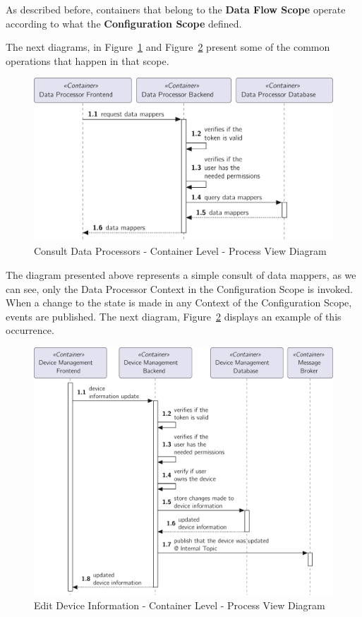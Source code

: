 As described before, containers that belong to the \textbf{Data Flow Scope} operate according to what the \textbf{Configuration Scope} defined.

The next diagrams, in Figure~\ref{fig:design:architecture:platform:container:process:diagram:processor} and Figure~\ref{fig:design:architecture:platform:container:process:diagram:device} present some of the common operations that happen in that scope.

\begin{figure}
   \centering
   \includegraphics[page=1,width=0.8\columnwidth]{assets/diagrams/design/architectural/level2/process/consult-data-processor.pdf}
   \caption[Consult Data Processors - Container Level - Process View Diagram]{Consult Data Processors - Container Level - Process View Diagram}
   \label{fig:design:architecture:platform:container:process:diagram:processor}
\end{figure}

The diagram presented above represents a simple consult of data mappers, as we can see, only the Data Processor Context in the Configuration Scope is invoked. When a change to the state is made in any Context of the Configuration Scope, events are published. The next diagram, Figure~\ref{fig:design:architecture:platform:container:process:diagram:device} displays an example of this occurrence.

\begin{figure}
   \centering
   \includegraphics[page=1,width=0.8\columnwidth]{assets/diagrams/design/architectural/level2/process/edit-device-management.pdf}
   \caption[Edit Device Information - Container Level - Process View Diagram]{Edit Device Information - Container Level - Process View Diagram}
   \label{fig:design:architecture:platform:container:process:diagram:device}
\end{figure}

